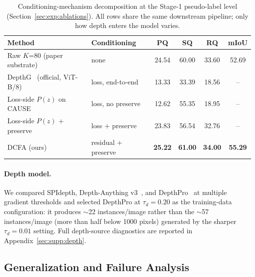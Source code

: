 \documentclass{article}
\begin{document}
\begin{table}[tbp]
\caption{Conditioning-mechanism decomposition at the Stage-1 pseudo-label level (Section~\ref{sec:exp:ablations}). All rows share the same downstream pipeline; only how depth enters the model varies.}
\label{tab:conditioning}
\centering
\scriptsize
\setlength{\tabcolsep}{3pt}
\begin{tabular}{@{}l l c c c c@{}}
\toprule
Method & Conditioning & PQ & SQ & RQ & mIoU \\
\midrule
Raw $K$=80 (paper substrate)        & none                  & 24.54 & 60.00 & 33.60 & 52.69 \\
DepthG~\cite{sick2024depthg} (official, ViT-B/8)          & loss, end-to-end      & 13.33 & 33.39 & 18.56 & -- \\
Loss-side $P(z)$ on CAUSE~\cite{kim2024cause}           & loss, no preserve     & 12.62 & 55.35 & 18.95 & -- \\
Loss-side $P(z)$ + preserve         & loss $+$ preserve     & 23.83 & 56.54 & 32.76 & -- \\
DCFA (ours)                         & residual $+$ preserve & \textbf{25.22} & \textbf{61.00} & \textbf{34.00} & \textbf{55.29} \\
\bottomrule
\end{tabular}
\end{table}

\paragraph{Depth model.}
We compared SPIdepth, Depth-Anything v3~\cite{lin2025da3}, and DepthPro~\cite{bochkovskii2024depthpro} at multiple gradient thresholds and selected DepthPro at $\tau_d{=}0.20$ as the training-data configuration: it produces $\sim$22 instances/image rather than the $\sim$57 instances/image (more than half below 1000 pixels) generated by the sharper $\tau_d{=}0.01$ setting. Full depth-source diagnostics are reported in Appendix~\ref{sec:supp:depth}.


\subsection{Generalization and Failure Analysis}
\label{sec:exp:generalization}
\end{document}
